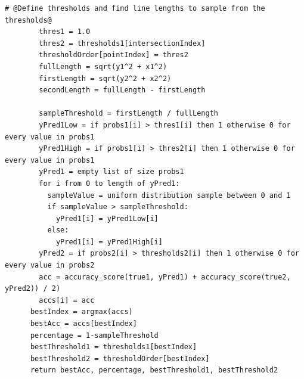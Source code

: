 \documentclass[11pt, fleqn, titlepage]{article}
\begin{document}
\begin{lstlisting}[escapechar=@,escapebegin=\itshape]
	    # @Define thresholds and find line lengths to sample from the thresholds@
	    thres1 = 1.0
	    thres2 = thresholds1[intersectionIndex]
	    thresholdOrder[pointIndex] = thres2
	    fullLength = sqrt(y1^2 + x1^2)
	    firstLength = sqrt(y2^2 + x2^2)
	    secondLength = fullLength - firstLength
		
	    sampleThreshold = firstLength / fullLength
	    yPred1Low = if probs1[i] > thres1[i] then 1 otherwise 0 for every value in probs1
	    yPred1High = if probs1[i] > thres2[i] then 1 otherwise 0 for every value in probs1
	    yPred1 = empty list of size probs1
	    for i from 0 to length of yPred1:
	      sampleValue = uniform distribution sample between 0 and 1
	      if sampleValue > sampleThreshold:
	        yPred1[i] = yPred1Low[i]
	      else:
	        yPred1[i] = yPred1High[i]
	    yPred2 = if probs2[i] > thresholds2[i] then 1 otherwise 0 for every value in probs2
	    acc = accuracy_score(true1, yPred1) + accuracy_score(true2, yPred2)) / 2)
	    accs[i] = acc
	  bestIndex = argmax(accs)
	  bestAcc = accs[bestIndex]
	  percentage = 1-sampleThreshold
	  bestThreshold1 = thresholds1[bestIndex]
	  bestThreshold2 = thresholdOrder[bestIndex]
	  return bestAcc, percentage, bestThreshold1, bestThreshold2
	\end{lstlisting}
	
\end{document}
